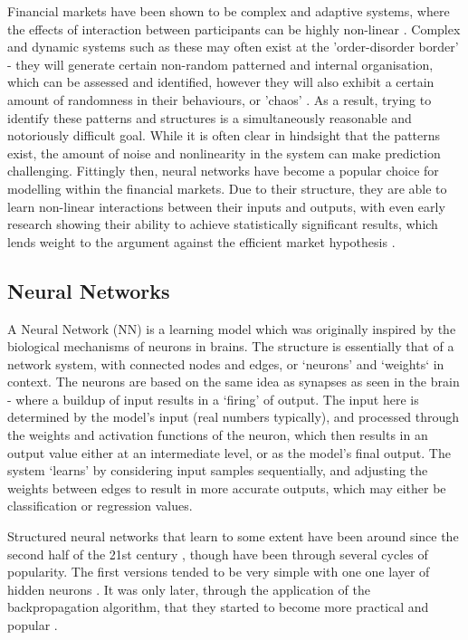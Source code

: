 \documentclass[a4paper,latin]{paper}
\begin{document}
Financial markets have been shown to be complex and adaptive systems, where the effects of interaction 
between participants can be highly non-linear \cite {Arthur}. Complex and dynamic systems such as these may 
often exist at the 'order-disorder border' - they will generate certain non-random patterned and internal organisation, 
which can be assessed and identified, however they will also exhibit a certain amount of randomness in their behaviours, 
or 'chaos' \cite {Crutchfield}. As a result, trying to identify these patterns and structures is a simultaneously 
reasonable and notoriously difficult goal. While it is often clear in hindsight that the patterns exist, the amount of 
noise and nonlinearity in the system can make prediction challenging.
Fittingly then, neural networks have become a popular choice for modelling within the financial markets. Due to 
their structure, they are able to learn non-linear interactions between their inputs and outputs, with even early research 
showing their ability to achieve statistically significant results, which lends weight to the 
argument against the efficient market hypothesis \cite {Skabar}. 
\hfill \break



\subsection{Neural Networks}\label{lr_nn}

A Neural Network (NN) is a learning model which was originally inspired by the biological mechanisms of neurons 
in brains. The structure is essentially that of a network system, with connected nodes and edges, or ‘neurons’ and 
‘weights‘ in context. The neurons are based on the same idea as synapses as seen in the brain - where a buildup 
of input results in a ‘firing’ of output. The input here is determined by the model’s input (real numbers typically), 
and processed through the weights and activation functions of the neuron, which then results in an output value 
either at an intermediate level, or as the model’s final output. The system ‘learns’ by considering input samples 
sequentially, and adjusting the weights between edges to result in more accurate outputs, which may either be 
classification or regression values. 
\hfill \break 

Structured neural networks that learn to some extent have been around since the second half of the 21st 
century \cite{Schmidhuber}, though have been through several cycles of popularity. The first versions tended to be very simple 
with one one layer of hidden neurons \cite{Ivakhnenko}. It was only later, through the application of 
the backpropagation algorithm, that they started to become more practical and popular \cite{Werbos}.
\hfill \break 
\end{document}

